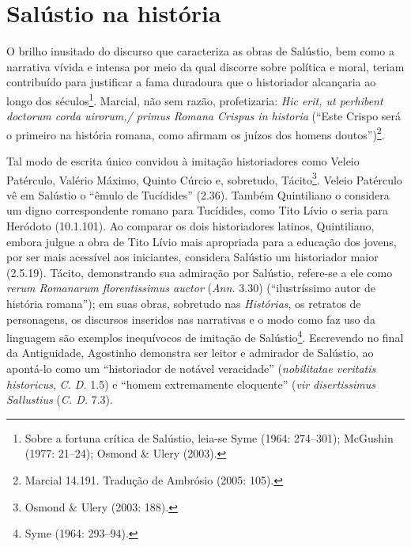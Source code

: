 \newcommand{\lat}{}%
\newcommand{\old}{\textsc{old}}
\newcommand{\lp}{\textsc{lp}}


\newcommand{\bra}{\selectlanguage{brazilian}{}} 
\newcommand{\ot}{\emph{Orator}\ }



\section{Salústio na história} 

O brilho inusitado do discurso que caracteriza
as obras de Salústio, bem como a narrativa vívida e intensa por meio da qual
discorre sobre política e moral, teriam contribuído para justificar a fama
duradoura que o historiador alcançaria ao longo dos séculos\footnote{Sobre a fortuna crítica de Salústio, leia-se Syme (1964: 274--301); McGushin (1977: 21--24); Osmond \& Ulery (2003).}. Marcial, não sem
razão, profetizaria: \emph{Hic erit, ut perhibent doctorum corda uirorum,/
primus Romana Crispus in historia}  (“Este Crispo será o primeiro na história
romana, como afirmam os juízos dos homens doutos”)\footnote{Marcial 14.191.
Tradução de Ambrósio (2005: 105).}. 

Tal modo de escrita único convidou à imitação historiadores como Veleio
Patérculo, Valério Máximo, Quinto Cúrcio e, sobretudo,
Tácito\footnote{Osmond \& Ulery (2003: 188).}. Veleio
Patérculo vê em Salústio o “êmulo de Tucídides” (2.36). Também Quintiliano o
considera um digno correspondente romano para Tucídides, como Tito Lívio o
seria para Heródoto (10.1.101).  Ao comparar os dois historiadores latinos,
Quintiliano, embora julgue a obra de Tito Lívio mais apropriada para a educação
dos jovens, por ser mais acessível aos iniciantes, considera Salústio um
historiador maior (2.5.19).  Tácito, demonstrando sua admiração por Salústio,
refere-se a ele como \lat \emph{rerum Romanarum florentissimus auctor} \bra
(\emph{Ann.} 3.30) (“ilustríssimo autor de história romana”); em suas obras,
sobretudo nas \emph{Histórias},  os retratos de personagens, os discursos
inseridos nas narrativas e o modo como faz uso da linguagem são exemplos
inequívocos de imitação de Salústio\footnote{Syme (1964: 293--94).}.
Escrevendo no final da Antiguidade, Agostinho  demonstra ser leitor e admirador
de Salústio, ao apontá-lo como um  “historiador de notável veracidade”
(\emph{nobilitatae veritatis historicus}, \emph{C. D.} 1.5) e ``homem
extremamente eloquente'' (\emph{vir disertissimus Sallustius} (\emph{C. D.} 7.3). 

